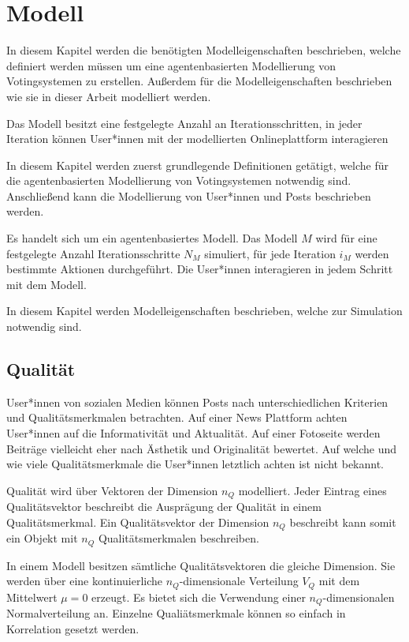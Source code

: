 \chapter{Modell}

In diesem Kapitel werden die benötigten Modelleigenschaften beschrieben, welche definiert werden müssen um eine agentenbasierten Modellierung von Votingsystemen zu erstellen. Außerdem für die Modelleigenschaften beschrieben wie sie in dieser Arbeit modelliert werden.

Das Modell besitzt eine festgelegte Anzahl an Iterationsschritten, in jeder Iteration können User*innen mit der modellierten Onlineplattform interagieren

In diesem Kapitel werden zuerst grundlegende Definitionen getätigt, welche für die agentenbasierten Modellierung von Votingsystemen notwendig sind. Anschließend kann die Modellierung von User*innen und Posts beschrieben werden. 

Es handelt sich um ein agentenbasiertes Modell. Das Modell $M$ wird für eine festgelegte Anzahl Iterationsschritte $N_M$ simuliert, für jede Iteration $i_M$ werden bestimmte Aktionen durchgeführt. Die User*innen interagieren in jedem Schritt mit dem Modell.

In diesem Kapitel werden Modelleigenschaften beschrieben, welche zur Simulation notwendig sind.

\section{Qualität}
User*innen von sozialen Medien können Posts nach unterschiedlichen Kriterien und Qualitätsmerkmalen betrachten. Auf einer News Plattform achten User*innen auf die Informativität und Aktualität. Auf einer Fotoseite werden Beiträge vielleicht eher nach Ästhetik und Originalität bewertet. Auf welche und wie viele Qualitätsmerkmale die User*innen letztlich achten ist nicht bekannt.

Qualität wird über Vektoren der Dimension $n_Q$ modelliert. Jeder Eintrag eines Qualitätsvektor beschreibt die Ausprägung der Qualität in einem Qualitätsmerkmal. Ein Qualitätsvektor der Dimension $n_Q$ beschreibt kann somit ein Objekt mit $n_Q$ Qualitätsmerkmalen beschreiben. 

In einem Modell besitzen sämtliche Qualitätsvektoren die gleiche Dimension. Sie werden über eine kontinuierliche $n_Q$-dimensionale Verteilung $V_Q$ mit dem Mittelwert $\mu = 0$ erzeugt. Es bietet sich die Verwendung einer $n_Q$-dimensionalen Normalverteilung an. Einzelne Qualiätsmerkmale können so einfach in Korrelation gesetzt werden. 


